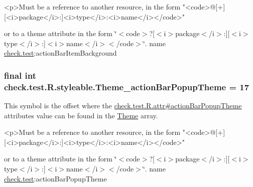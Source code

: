 \begin{DoxyVerb}      <p>Must be a reference to another resource, in the form "<code>@[+][<i>package</i>:]<i>type</i>:<i>name</i></code>"
\end{DoxyVerb}
 or to a theme attribute in the form \char`\"{}$<$code$>$?\mbox{[}$<$i$>$package$<$/i$>$\+:\mbox{]}\mbox{[}$<$i$>$type$<$/i$>$\+:\mbox{]}$<$i$>$name$<$/i$>$$<$/code$>$\char`\"{}.  name \hyperlink{namespacecheck_1_1test}{check.\+test}\+:action\+Bar\+Item\+Background \hypertarget{classcheck_1_1test_1_1_r_1_1styleable_a73283effe9ac39eb90c34200c9d71c48}{}
\subsubsection[{Theme\+\_\+action\+Bar\+Popup\+Theme}]{\setlength{\rightskip}{0pt plus 5cm}final int check.\+test.\+R.\+styleable.\+Theme\+\_\+action\+Bar\+Popup\+Theme = 17\hspace{0.3cm}{\ttfamily [static]}}\label{classcheck_1_1test_1_1_r_1_1styleable_a73283effe9ac39eb90c34200c9d71c48}
This symbol is the offset where the \hyperlink{classcheck_1_1test_1_1_r_1_1attr_a4ab4b2cb9a1376a8d56e464bd8eb74a2}{check.\+test.\+R.\+attr\#action\+Bar\+Popup\+Theme} attribute\textquotesingle{}s value can be found in the \hyperlink{classcheck_1_1test_1_1_r_1_1styleable_acca726d02016a0cf607782ec3a436a81}{Theme} array.

\begin{DoxyVerb}      <p>Must be a reference to another resource, in the form "<code>@[+][<i>package</i>:]<i>type</i>:<i>name</i></code>"
\end{DoxyVerb}
 or to a theme attribute in the form \char`\"{}$<$code$>$?\mbox{[}$<$i$>$package$<$/i$>$\+:\mbox{]}\mbox{[}$<$i$>$type$<$/i$>$\+:\mbox{]}$<$i$>$name$<$/i$>$$<$/code$>$\char`\"{}.  name \hyperlink{namespacecheck_1_1test}{check.\+test}\+:action\+Bar\+Popup\+Theme \hypertarget{classcheck_1_1test_1_1_r_1_1styleable_af17d29383b2372457182672f93aeb8e6}{}
